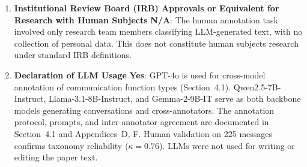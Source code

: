 \documentclass{article}
\renewcommand{\answerYes}[1]{\textbf{Yes}: #1}
\renewcommand{\answerNA}[1]{\textbf{N/A}: #1}
\begin{document}
\begin{enumerate}
\item {\bf Institutional Review Board (IRB) Approvals or Equivalent for Research with Human Subjects}
    \answerNA{The human annotation task involved only research team members classifying LLM-generated text, with no collection of personal data. This does not constitute human subjects research under standard IRB definitions.}

\item {\bf Declaration of LLM Usage}
    \answerYes{GPT-4o is used for cross-model annotation of communication function types (Section~4.1). Qwen2.5-7B-Instruct, Llama-3.1-8B-Instruct, and Gemma-2-9B-IT serve as both backbone models generating conversations and cross-annotators. The annotation protocol, prompts, and inter-annotator agreement are documented in Section~4.1 and Appendices~D, F. Human validation on 225 messages confirms taxonomy reliability ($\kappa = 0.76$). LLMs were not used for writing or editing the paper text.}

\end{enumerate}
\end{document}
